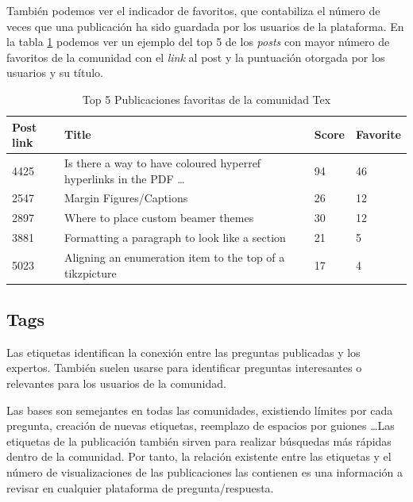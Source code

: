 \documentclass[a4paper, 12pt]{book}
\begin{document}
También podemos ver el indicador de favoritos, que contabiliza el número de veces que una publicación ha sido guardada por los usuarios de la plataforma. En la tabla \ref{table:top_5_tex} podemos ver un ejemplo del top 5 de los \emph{posts} con mayor número de favoritos de la comunidad con el \emph{link} al post y la puntuación otorgada por los usuarios y su título. 
\begin{table}[ht]
\centering
    \begin{tabular}{@{} p{2cm} p{6cm} p{1cm} p{2cm} @{}}
        \hline
        Post link & Title & Score & Favorite \\
        \hline
        4425 & Is there a way to have coloured hyperref hyperlinks in the PDF \ldots & 94 & 46 \\
        2547 & Margin Figures/Captions & 26 & 12 \\
        2897 & Where to place custom beamer themes & 30 & 12 \\
        3881 & Formatting a paragraph to look like a section & 21 & 5 \\
        5023 & Aligning an enumeration item to the top of a tikzpicture & 17 & 4 \\ 
        \hline
    \end{tabular}
\caption{Top 5 Publicaciones favoritas de la comunidad Tex}
\label{table:top_5_tex}
\end{table}




\subsection{Tags}
Las etiquetas identifican la conexión entre las preguntas publicadas y los expertos. También suelen usarse para identificar preguntas interesantes o relevantes para los usuarios de la comunidad. 

Las bases son semejantes en todas las comunidades, existiendo límites por cada pregunta, creación de nuevas etiquetas, reemplazo de espacios por guiones \ldots Las etiquetas de la publicación también sirven para realizar búsquedas más rápidas dentro de la comunidad. Por tanto, la relación existente entre las etiquetas y el número de visualizaciones de las publicaciones las contienen es una información a revisar en cualquier plataforma de pregunta/respuesta.
\end{document}
